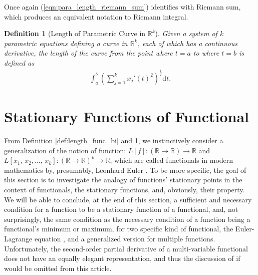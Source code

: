 \documentclass[12pt,a4paper]{article}
\newtheorem{definition}{Definition}
\newcommand{\eqnref}[1]{(\ref{#1})}
\begin{document}
Once again \eqnref{eqn:para_length_riemann_sum} identifies with Riemann sum, which produces an equivalent notation to Riemann integral.
\begin{definition}[Length of Parametric Curve in $\mathbb{R}^k$]\label{def:length_para}
Given a system of $k$ parametric equations defining a curve in $\mathbb{R}^k$, each of which has a continuous derivative, the length of the curve from the point where $t=a$ to where $t=b$ is defined as
\begin{gather}
\label{eqn:length_para}
\int_a^b\left(\sum_{j=1}^k{x_j}'(t)^2\right)^{\frac{1}{2}}\mathrm{d}t.
\end{gather}
\end{definition}

\section{Stationary Functions of Functional}
From Definition \ref{def:length_func_bi} and \ref{def:length_para}, we instinctively consider a generalization of the notion of function: $L[f]:(\mathbb{R}\to\mathbb{R})\to\mathbb{R}$ and $L[x_1,\,x_2,\dots,\,x_k]:(\mathbb{R}\to\mathbb{R})^k\to\mathbb{R}$, which are called functionals in modern mathematics by, presumably, Leonhard Euler \cite{euler_calc_var}. To be more specific, the goal of this section is to investigate the analogy of functions' stationary points in the context of functionals, the stationary functions, and, obviously, their property. We will be able to conclude, at the end of this section, a sufficient and necessary condition for a function to be a stationary function of a functional, and, not surprisingly, the same condition as the necessary condition of a function being a functional's minimum or maximum, for two specific kind of functional, the Euler-Lagrange equation \cite{euler_calc_var} \cite{weinstock_calc_var}, and a generalized version for multiple functions. Unfortunately, the second-order partial derivative of a multi-variable functional does not have an equally elegant representation, and thus the discussion of if would be omitted from this article.
\end{document}
